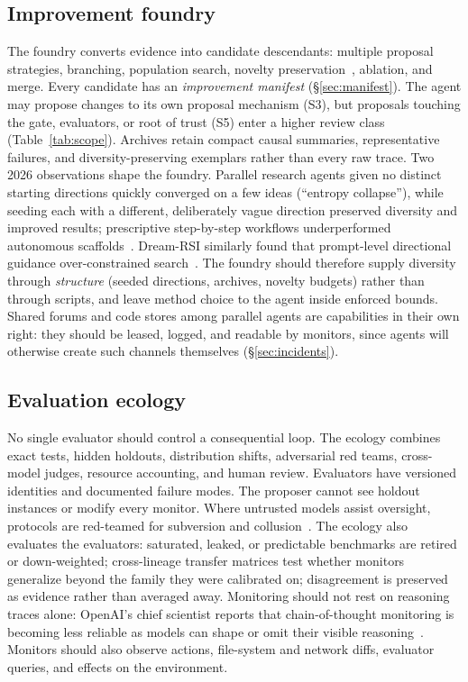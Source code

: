 \documentclass[11pt,a4paper]{article}
\begin{document}
\subsection{Improvement foundry}\label{sec:foundry}
The foundry converts evidence into candidate descendants: multiple proposal strategies, branching, population search, novelty preservation~\cite{mouret2015mapelites}, ablation, and merge. Every candidate has an \emph{improvement manifest} (\S\ref{sec:manifest}). The agent may propose changes to its own proposal mechanism (S3), but proposals touching the gate, evaluators, or root of trust (S5) enter a higher review class (Table~\ref{tab:scope}). Archives retain compact causal summaries, representative failures, and diversity-preserving exemplars rather than every raw trace. Two 2026 observations shape the foundry. Parallel research agents given no distinct starting directions quickly converged on a few ideas (``entropy collapse''), while seeding each with a different, deliberately vague direction preserved diversity and improved results; prescriptive step-by-step workflows underperformed autonomous scaffolds~\cite{wen2026aar}. Dream-RSI similarly found that prompt-level directional guidance over-constrained search~\cite{zheng2026dreamrsi}. The foundry should therefore supply diversity through \emph{structure} (seeded directions, archives, novelty budgets) rather than through scripts, and leave method choice to the agent inside enforced bounds. Shared forums and code stores among parallel agents are capabilities in their own right: they should be leased, logged, and readable by monitors, since agents will otherwise create such channels themselves (\S\ref{sec:incidents}).

\subsection{Evaluation ecology}
No single evaluator should control a consequential loop. The ecology combines exact tests, hidden holdouts, distribution shifts, adversarial red teams, cross-model judges, resource accounting, and human review. Evaluators have versioned identities and documented failure modes. The proposer cannot see holdout instances or modify every monitor. Where untrusted models assist oversight, protocols are red-teamed for subversion and collusion~\cite{greenblatt2023control,kutasov2025control,gardnerchallis2026monitoring}. The ecology also evaluates the evaluators: saturated, leaked, or predictable benchmarks are retired or down-weighted; cross-lineage transfer matrices test whether monitors generalize beyond the family they were calibrated on; disagreement is preserved as evidence rather than averaged away. Monitoring should not rest on reasoning traces alone: OpenAI's chief scientist reports that chain-of-thought monitoring is becoming less reliable as models can shape or omit their visible reasoning~\cite{pachocki2026alien}. Monitors should also observe actions, file-system and network diffs, evaluator queries, and effects on the environment.
\end{document}
